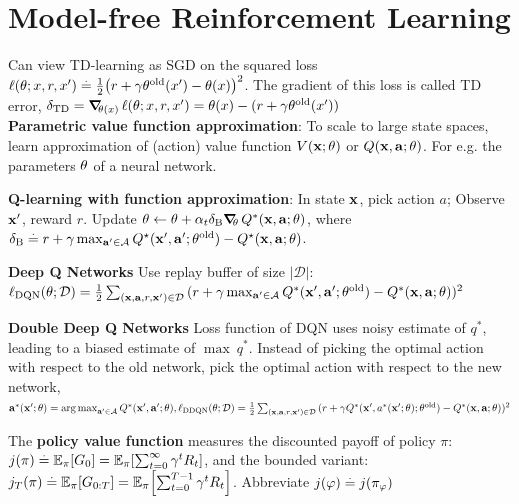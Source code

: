 \section{Model-free Reinforcement Learning}
Can view TD-learning as SGD on the squared loss $\ell(\vtheta; x, r, x') \defeq \frac{1}{2}\parentheses*{r + \gamma \old{\vtheta}(x') - \vtheta(x)}^2$. 
The gradient of this loss is called TD error, \(\delta_{\mathrm{TD}}=\grad_{\vtheta(x)}\ell(\vtheta; x, r, x')=\vtheta(x)-(r+\gamma\theta^{\mathrm{old}}(x'))\) \\
\textbf{Parametric value function approximation}: To scale to large state spaces, learn approximation
of (action) value function $\V{\vx; \vtheta}$ or $\Q{\vx}{\va; \vtheta}$. For e.g. the parameters $\mathbf{\theta}$ of a neural network.
\begin{framed}
    \textbf{Q-learning with function approximation}: In state $\mathbf{x}$, pick action $a$; Observe $\mathbf{x}'$, reward $r$. Update $\vtheta \gets \vtheta + \alpha_t \delta_\mathrm{B} \grad_\vtheta Q^*(\vx, \va; \vtheta)$, where $\delta_\mathrm{B} \defeq r + \gamma \max_{\vap \in \spA} \Q*{\vxp}{\vap; \old{\vtheta}} - \Q*{\vx}{\va; \vtheta}$.
\end{framed}
\begin{framed}
    \textbf{Deep Q Networks}
    Use replay buffer of size \(|\mathcal{D}|\): \(\ell_{\mathrm{DQN}}(\mathbf{\theta}; \mathcal{D})=\frac{1}{2}\sum_{(\mathbf{x}, \mathbf{a}, r, \mathbf{x}')\in \mathcal{D}}{(r+\gamma \max_{\mathbf{a}'\in \mathcal{A}}Q^*(\mathbf{x}',\mathbf{a}'; \mathbf{\theta}^{\mathrm{old}})}-Q^*(\mathbf{x},\mathbf{a};\mathbf{\theta}))^2\)
\end{framed}
\begin{framed}
    \textbf{Double Deep Q Networks}
    Loss function of DQN uses noisy estimate of \(q^*\), leading to a biased estimate of  \(\max\ q^*\).
    Instead of picking the optimal action with respect to the old network, pick the optimal action with respect to the new network, \(\mathbf{a}^*(\mathbf{x}';\mathbf{\theta})=\operatorname*{arg\,max}_{\mathbf{a}'\in \mathcal{A}} Q^*(\mathbf{x}',\mathbf{a}';\mathbf{\theta}), \ell_{\mathrm{DDQN}}(\mathbf{\theta}; \mathcal{D})=\frac{1}{2}\sum_{(\mathbf{x}, \mathbf{a}, r, \mathbf{x}')\in \mathcal{D}}{(r+\gamma Q^*(\mathbf{x}',a^*(\mathbf{x}';\mathbf{\theta}); \mathbf{\theta}^{\mathrm{old}})}-Q^*(\mathbf{x},\mathbf{a};\mathbf{\theta}))^2\)
\end{framed}
\begin{framed}
    The \textbf{policy value function} measures the discounted payoff of policy $\pi$: $\j{\pi} \defeq \E[\pi]{G_0} = \E[\pi]{\sum_{t=0}^\infty \gamma^t R_t}$, and the bounded variant: $\j{\pi}[T] \defeq \E[\pi]{G_{0:T}} = \E[\pi]{\sum_{t=0}^{T-1} \gamma^t R_t}$. Abbreviate $\j{\vvarphi} \defeq \j{\pi_\vvarphi}$
\end{framed}
